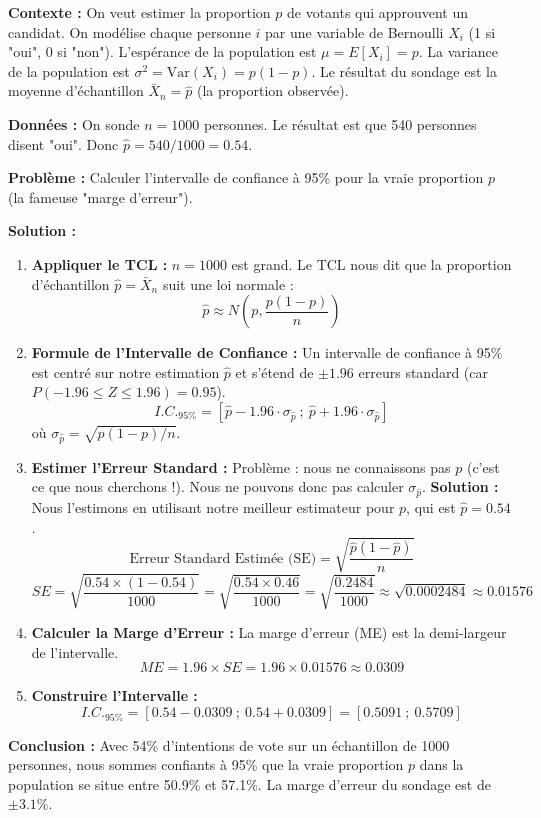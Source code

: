 \begin{examplebox}
\textbf{Contexte :} On veut estimer la proportion $p$ de votants qui approuvent un candidat. On modélise chaque personne $i$ par une variable de Bernoulli $X_i$ (1 si "oui", 0 si "non").
L'espérance de la population est $\mu = E[X_i] = p$.
La variance de la population est $\sigma^2 = \text{Var}(X_i) = p(1-p)$.
Le résultat du sondage est la moyenne d'échantillon $\bar{X}_n = \hat{p}$ (la proportion observée).

\textbf{Données :} On sonde $n=1000$ personnes. Le résultat est que 540 personnes disent "oui". Donc $\hat{p} = 540/1000 = 0.54$.

\textbf{Problème :} Calculer l'intervalle de confiance à 95\% pour la vraie proportion $p$ (la fameuse "marge d'erreur").

\textbf{Solution :}
\begin{enumerate}
    \item \textbf{Appliquer le TCL :}
    $n=1000$ est grand. Le TCL nous dit que la proportion d'échantillon $\hat{p} = \bar{X}_n$ suit une loi normale :
    $$ \hat{p} \approx N\left(p, \frac{p(1-p)}{n}\right) $$
    
    \item \textbf{Formule de l'Intervalle de Confiance :}
    Un intervalle de confiance à 95\% est centré sur notre estimation $\hat{p}$ et s'étend de $\pm 1.96$ erreurs standard (car $P(-1.96 \le Z \le 1.96) = 0.95$).
    $$ I.C._{95\%} = \left[ \hat{p} - 1.96 \cdot \sigma_{\hat{p}} \ ; \ \hat{p} + 1.96 \cdot \sigma_{\hat{p}} \right] $$
    où $\sigma_{\hat{p}} = \sqrt{p(1-p)/n}$.
    
    \item \textbf{Estimer l'Erreur Standard :}
    Problème : nous ne connaissons pas $p$ (c'est ce que nous cherchons !). Nous ne pouvons donc pas calculer $\sigma_{\hat{p}}$.
    \textbf{Solution :} Nous l'estimons en utilisant notre meilleur estimateur pour $p$, qui est $\hat{p} = 0.54$.
    $$ \text{Erreur Standard Estimée (SE)} = \sqrt{\frac{\hat{p}(1-\hat{p})}{n}} $$
    $$ SE = \sqrt{\frac{0.54 \times (1 - 0.54)}{1000}} = \sqrt{\frac{0.54 \times 0.46}{1000}} = \sqrt{\frac{0.2484}{1000}} \approx \sqrt{0.0002484} \approx 0.01576 $$
    
    \item \textbf{Calculer la Marge d'Erreur :}
    La marge d'erreur (ME) est la demi-largeur de l'intervalle.
    $$ ME = 1.96 \times SE = 1.96 \times 0.01576 \approx 0.0309 $$
    
    \item \textbf{Construire l'Intervalle :}
    $$ I.C._{95\%} = [ 0.54 - 0.0309 \ ; \ 0.54 + 0.0309 ] = [ 0.5091 \ ; \ 0.5709 ] $$
\end{enumerate}
\textbf{Conclusion :} Avec 54\% d'intentions de vote sur un échantillon de 1000 personnes, nous sommes confiants à 95\% que la vraie proportion $p$ dans la population se situe entre 50.9\% et 57.1\%. La marge d'erreur du sondage est de $\pm 3.1\%$.
\end{examplebox}